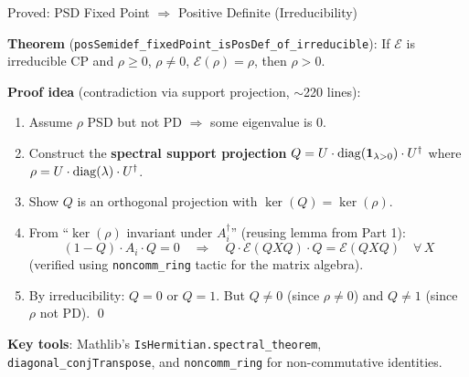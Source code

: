 \documentclass[aspectratio=169,10pt]{beamer}
\begin{document}
\begin{frame}{Proved: PSD Fixed Point $\Rightarrow$ Positive Definite (Irreducibility)}
    \vspace{-0.3em}

    \textbf{Theorem} (\texttt{posSemidef\_fixedPoint\_isPosDef\_of\_irreducible}):
    If $\mathcal{E}$ is irreducible CP and $\rho \geq 0$, $\rho \neq 0$,
    $\mathcal{E}(\rho) = \rho$, then $\rho > 0$.

    \vspace{0.2em}
    \textbf{Proof idea} (contradiction via support projection, $\sim$220 lines):
    \begin{enumerate}\itemsep0.15em
        \item {\small Assume $\rho$ PSD but not PD $\Rightarrow$ some eigenvalue is 0.}
        \item {\small Construct the \textbf{spectral support projection}
            $Q = U \cdot \mathrm{diag}(\mathbf{1}_{\lambda > 0}) \cdot U^\dagger$
            where $\rho = U \cdot \mathrm{diag}(\lambda) \cdot U^\dagger$.}
        \item {\small Show $Q$ is an orthogonal projection with $\ker(Q) = \ker(\rho)$.}
        \item {\small From ``$\ker(\rho)$ invariant under $A_i^\dagger$'' (reusing lemma from Part 1):
            \[
                (1 - Q) \cdot A_i \cdot Q = 0 \quad\Longrightarrow\quad
                Q \cdot \mathcal{E}(Q X Q) \cdot Q = \mathcal{E}(Q X Q) \quad \forall\, X
            \]
            (verified using \texttt{noncomm\_ring} tactic for the matrix algebra).}
        \item {\small By irreducibility: $Q = 0$ or $Q = 1$.
            But $Q \neq 0$ (since $\rho \neq 0$) and $Q \neq 1$ (since $\rho$ not PD). \qed}
    \end{enumerate}

    \vspace{0.2em}
    {\small \textbf{Key tools}: Mathlib's \texttt{IsHermitian.spectral\_theorem},
    \texttt{diagonal\_conjTranspose}, and \texttt{noncomm\_ring} for non-commutative identities.}
\end{frame}
\end{document}
